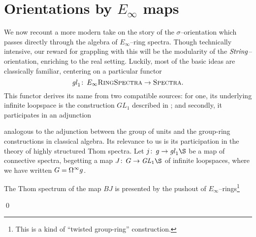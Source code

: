 \section{Orientations by \texorpdfstring{\(E_\infty\)}{Eoo} maps}\label{JuvitopTalkSection}

We now recount a more modern take on the story of the \(\sigma\)--orientation which passes directly through the algebra of \(E_\infty\)--ring spectra.  Though technically intensive, our reward for grappling with this will be the modularity of the \(\mathit{String}\)--orientation, enriching  to the real setting.  Luckily, most of the basic ideas are classically familiar, centering on a particular functor \[\mathit{gl}_1\colon\thinspace E_\infty\normalfont\textsc{RingSpectra} \to \normalfont\textsc{Spectra}.\]  This functor derives its name from two compatible sources: for one, its underlying infinite loopspace is the construction \(GL_1\) described in ; and secondly, it participates in an adjunction
\begin{center}
\end{center}
analogous to the adjunction between the group of units and the group-ring constructions in classical algebra.  Its relevance to us is its participation in the theory of highly structured Thom spectra.  Let \(j\co g \to \gl_1 \S\) be a map of connective spectra, begetting a map \(J\co G \to \GL_1 \S\) of infinite loopspaces, where we have written \(G = \Omega^\infty g\).
\begin{lemma}
The Thom spectrum of the map \(BJ\) is presented by the pushout of \(E_\infty\)--rings\footnote{This is a kind of ``twisted group-ring'' construction.}
\begin{center}
\end{center}
\qed
\end{lemma}

